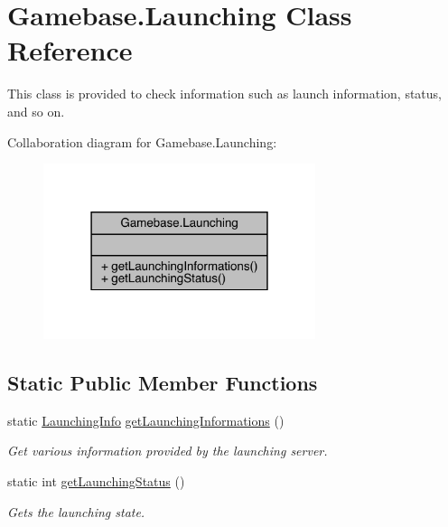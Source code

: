\hypertarget{classcom_1_1toast_1_1android_1_1gamebase_1_1_gamebase_1_1_launching}{}\section{Gamebase.\+Launching Class Reference}
\label{classcom_1_1toast_1_1android_1_1gamebase_1_1_gamebase_1_1_launching}


This class is provided to check information such as launch information, status, and so on.  




Collaboration diagram for Gamebase.\+Launching\+:
\nopagebreak
\begin{figure}[H]
\begin{center}
\leavevmode
\includegraphics[width=226pt]{classcom_1_1toast_1_1android_1_1gamebase_1_1_gamebase_1_1_launching__coll__graph}
\end{center}
\end{figure}
\subsection*{Static Public Member Functions}
\begin{DoxyCompactItemize}
\item 
static \hyperlink{classcom_1_1toast_1_1android_1_1gamebase_1_1launching_1_1data_1_1_launching_info}{Launching\+Info} \hyperlink{classcom_1_1toast_1_1android_1_1gamebase_1_1_gamebase_1_1_launching_a93ab4a06b72866dace784957cbf218c0}{get\+Launching\+Informations} ()
\begin{DoxyCompactList}\small\item\em Get various information provided by the launching server. \end{DoxyCompactList}\item 
static int \hyperlink{classcom_1_1toast_1_1android_1_1gamebase_1_1_gamebase_1_1_launching_a279d78644ff42918857fcb056a38ff49}{get\+Launching\+Status} ()
\begin{DoxyCompactList}\small\item\em Gets the launching state. \end{DoxyCompactList}\end{DoxyCompactItemize}


